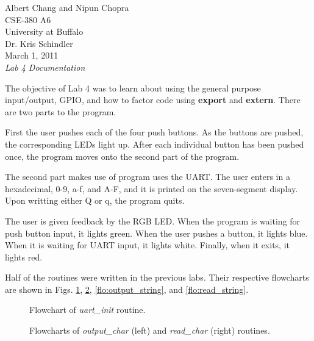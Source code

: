 \documentclass[letterpaper,10pt]{article}
\begin{document}
    Albert Chang and Nipun Chopra\\
    CSE-380 A6\\
    University at Buffalo\\
    Dr. Kris Schindler\\
    March 1, 2011\\
    \textit{Lab 4 Documentation}

    The objective of Lab 4 was to learn about using the general purpose
    input/output, GPIO, and how to factor code using \textbf{export} and
    \textbf{extern}. There are two parts to the program.

    First the user pushes each of the four push buttons. As the buttons are
    pushed, the corresponding LEDs light up. After each individual button has
    been pushed once, the program moves onto the second part of the program.

    The second part makes use of program uses the UART. The user enters in a
    hexadecimal, 0-9, a-f, and A-F, and it is printed on the seven-segment
    display. Upon writting either Q or q, the program quits.

    The user is given feedback by the RGB LED. When the program is waiting for
    push button input, it lights green. When the user pushes a button, it
    lights blue. When it is waiting for UART input, it lights white. Finally,
    when it exits, it lights red.

    Half of the routines were written in the previous labs. Their respective
    flowcharts are shown in Figs. \ref{flo:uart_init}, \ref{flo:chars},
    \ref{flo:output_string}, and \ref{flo:read_string}.

    \begin{figure}[p]
        
        \caption{Flowchart of \textit{uart\_init} routine.}
        \label{flo:uart_init}
    \end{figure}

    \begin{figure}[p]
        \begin{minipage}{0.5\linewidth}
            
        \end{minipage}%
        \begin{minipage}{0.5\linewidth}
            
        \end{minipage}
        \caption{Flowcharts of \textit{output\_char} (left) and \textit{read\_char} (right) routines.}
        \label{flo:chars}
    \end{figure}
\end{document}
